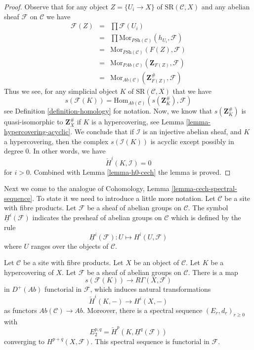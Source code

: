\begin{proof}
Observe that for any object $Z = \{U_i \to X\}$ of
$\text{SR}(\mathcal{C}, X)$ and any abelian sheaf
$\mathcal{F}$ on $\mathcal{C}$ we have
\begin{eqnarray*}
\mathcal{F}(Z)
& = &
\prod \mathcal{F}(U_i) \\
& = &
\prod \text{Mor}_{\textit{PSh}(\mathcal{C})}(h_{U_i}, \mathcal{F})\\
& = &
\text{Mor}_{\textit{PSh}(\mathcal{C})}(F(Z), \mathcal{F})\\
& = &
\text{Mor}_{\textit{PAb}(\mathcal{C})}(\mathbf{Z}_{F(Z)}, \mathcal{F}) \\
& = &
\text{Mor}_{\textit{Ab}(\mathcal{C})}(\mathbf{Z}_{F(Z)}^\#, \mathcal{F})
\end{eqnarray*}
Thus we see, for any simplicial object $K$ of
$\text{SR}(\mathcal{C}, X)$ that we have
\begin{equation}
\label{equation-identify-cech}
s(\mathcal{F}(K))
=
\text{Hom}_{\textit{Ab}(\mathcal{C})}(s(\mathbf{Z}_K^\#), \mathcal{F})
\end{equation}
see Definition \ref{definition-homology} for notation.
Now, we know that $s(\mathbf{Z}_K^\#)$ is quasi-isomorphic
to $\mathbf{Z}_X^\#$ if $K$ is a hypercovering, see
Lemma \ref{lemma-hypercovering-acyclic}. We conclude
that if $\mathcal{I}$ is an injective abelian sheaf, and
$K$ a hypercovering, then the complex $s(\mathcal{I}(K))$
is acyclic except possibly in degree $0$.
In other words, we have
$$
\check{H}^i(K, \mathcal{I}) = 0
$$
for $i > 0$. Combined with Lemma \ref{lemma-h0-cech} the lemma is proved.
\end{proof}

\noindent
Next we come to the analogue of
Cohomology, Lemma \ref{lemma-cech-spectral-sequence}.
To state it we need to introduce a little more notation.
Let $\mathcal{C}$ be a site with fibre products.
Let $\mathcal{F}$ be a sheaf of abelian groups on $\mathcal{C}$.
The symbol $\underline{H}^i(\mathcal{F})$ indicates the presheaf
of abelian groups on $\mathcal{C}$ which is defined by the
rule
$$
\underline{H}^i(\mathcal{F}) : U \longmapsto H^i(U, \mathcal{F})
$$
where $U$ ranges over the objects of $\mathcal{C}$.

\begin{lemma}
\label{lemma-cech-spectral-sequence}
Let $\mathcal{C}$ be a site with fibre products.
Let $X$ be an object of $\mathcal{C}$.
Let $K$ be a hypercovering of $X$.
Let $\mathcal{F}$ be a sheaf of abelian groups on $\mathcal{C}$.
There is a map
$$
s(\mathcal{F}(K))
\longrightarrow
R\Gamma(X, \mathcal{F})
$$
in $D^{+}(\textit{Ab})$ functorial in $\mathcal{F}$, which induces
natural transformations
$$
\check{H}^i(K, -) \longrightarrow H^i(X, -)
$$
as functors $\textit{Ab}(\mathcal{C}) \to \textit{Ab}$. Moreover,
there is a spectral sequence $(E_r, d_r)_{r \geq 0}$ with
$$
E_2^{p, q} = \check{H}^p(K, \underline{H}^q(\mathcal{F}))
$$
converging to $H^{p + q}(X, \mathcal{F})$.
This spectral sequence is functorial in $\mathcal{F}$.
\end{lemma}

